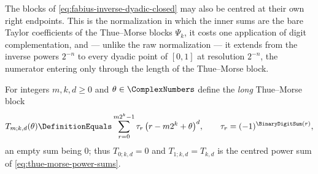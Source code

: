 \documentclass[11pt,a4paper,oneside,openany]{book}
\theoremstyle{definition}
\theoremstyle{remark}
\begin{document}

The blocks of \eqref{eq:fabius-inverse-dyadic-closed} may also be centred at their
own right endpoints.  This is the normalization in which the inner sums are the
bare Taylor coefficients of the Thue--Morse blocks $\Psi_k$, it costs one
application of digit complementation, and --- unlike the raw normalization --- it
extends from the inverse powers $2^{-n}$ to every dyadic point of $[0,1]$ at
resolution $2^{-n}$, the numerator entering only through the length of the
Thue--Morse block.

For integers $m,k,d\ge0$ and $\theta\in\ComplexNumbers$ define the \emph{long} Thue--Morse block
\begin{equation}\label{eq:fabius-long-block}
 T_{m;k,d}(\theta)\DefinitionEquals\sum_{r=0}^{m2^k-1}\tau_r\,\bigl(r-m2^k+\theta\bigr)^d,
 \qquad \tau_r=(-1)^{\BinaryDigitSum(r)},
\end{equation}
an empty sum being $0$; thus $T_{0;k,d}=0$ and $T_{1;k,d}=T_{k,d}$ is the centred
power sum of \eqref{eq:thue-morse-power-sums}.
\end{document}
